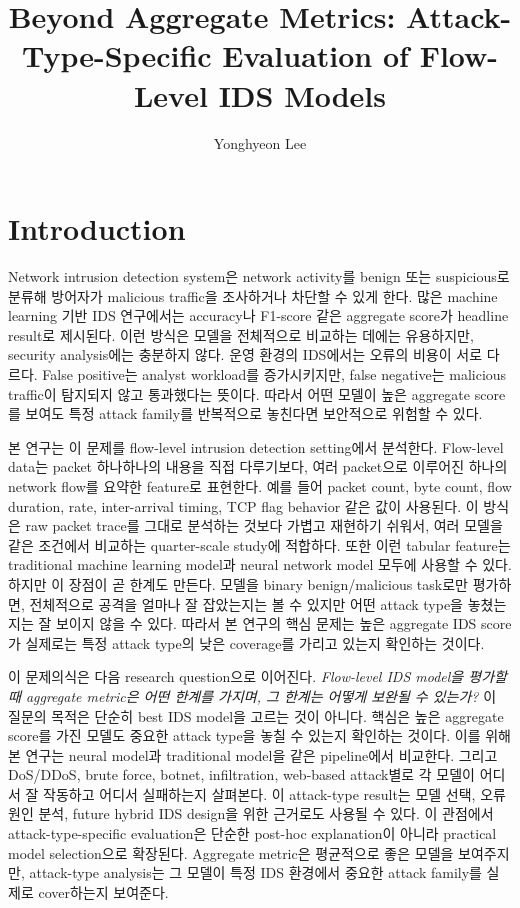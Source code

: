 \documentclass[sigconf,nonacm]{acmart}
\title{Beyond Aggregate Metrics: Attack-Type-Specific Evaluation of Flow-Level IDS Models}
\author{Yonghyeon Lee}
\affiliation{%
  \country{}
}
\begin{document}
\maketitle

\section{Introduction}

Network intrusion detection system은 network activity를 benign 또는 suspicious로 분류해 방어자가 malicious traffic을 조사하거나 차단할 수 있게 한다.
많은 machine learning 기반 IDS 연구에서는 accuracy나 F1-score 같은 aggregate score가 headline result로 제시된다.
이런 방식은 모델을 전체적으로 비교하는 데에는 유용하지만, security analysis에는 충분하지 않다.
운영 환경의 IDS에서는 오류의 비용이 서로 다르다.
False positive는 analyst workload를 증가시키지만, false negative는 malicious traffic이 탐지되지 않고 통과했다는 뜻이다.
따라서 어떤 모델이 높은 aggregate score를 보여도 특정 attack family를 반복적으로 놓친다면 보안적으로 위험할 수 있다.

본 연구는 이 문제를 flow-level intrusion detection setting에서 분석한다.
Flow-level data는 packet 하나하나의 내용을 직접 다루기보다, 여러 packet으로 이루어진 하나의 network flow를 요약한 feature로 표현한다.
예를 들어 packet count, byte count, flow duration, rate, inter-arrival timing, TCP flag behavior 같은 값이 사용된다.
이 방식은 raw packet trace를 그대로 분석하는 것보다 가볍고 재현하기 쉬워서, 여러 모델을 같은 조건에서 비교하는 quarter-scale study에 적합하다.
또한 이런 tabular feature는 traditional machine learning model과 neural network model 모두에 사용할 수 있다.
하지만 이 장점이 곧 한계도 만든다.
모델을 binary benign/malicious task로만 평가하면, 전체적으로 공격을 얼마나 잘 잡았는지는 볼 수 있지만 어떤 attack type을 놓쳤는지는 잘 보이지 않을 수 있다.
따라서 본 연구의 핵심 문제는 높은 aggregate IDS score가 실제로는 특정 attack type의 낮은 coverage를 가리고 있는지 확인하는 것이다.

이 문제의식은 다음 research question으로 이어진다.
\emph{Flow-level IDS model을 평가할 때 aggregate metric은 어떤 한계를 가지며, 그 한계는 어떻게 보완될 수 있는가?}
이 질문의 목적은 단순히 best IDS model을 고르는 것이 아니다.
핵심은 높은 aggregate score를 가진 모델도 중요한 attack type을 놓칠 수 있는지 확인하는 것이다.
이를 위해 본 연구는 neural model과 traditional model을 같은 pipeline에서 비교한다.
그리고 DoS/DDoS, brute force, botnet, infiltration, web-based attack별로 각 모델이 어디서 잘 작동하고 어디서 실패하는지 살펴본다.
이 attack-type result는 모델 선택, 오류 원인 분석, future hybrid IDS design을 위한 근거로도 사용될 수 있다.
이 관점에서 attack-type-specific evaluation은 단순한 post-hoc explanation이 아니라 practical model selection으로 확장된다.
Aggregate metric은 평균적으로 좋은 모델을 보여주지만, attack-type analysis는 그 모델이 특정 IDS 환경에서 중요한 attack family를 실제로 cover하는지 보여준다.
\end{document}
